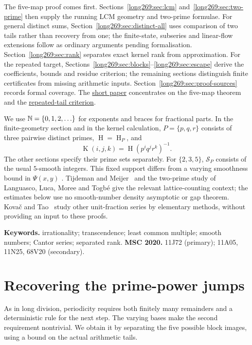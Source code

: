 \documentclass[11pt]{article}
\theoremstyle{remark}
\theoremstyle{plain}
\newcommand{\hgt}{\operatorname{H}}
\newcommand{\Kernel}{\operatorname{K}}
\begin{document}
The five-map proof comes first. Sections~\ref{long269:sec:lcm}
and~\ref{long269:sec:two-prime} then supply the running LCM geometry and
two-prime formulae. For general distinct sums,
Section~\ref{long269:sec:distinct-all} uses comparison of two tails rather
than recovery from one; the finite-state, subseries and linear-flow
extensions follow as ordinary arguments pending formalisation.
Section~\ref{long269:sec:rank} separates exact kernel rank from approximation.
For the repeated target, Sections~\ref{long269:sec:blocks}--\ref{long269:sec:escape}
derive the coefficients, bounds and residue criterion; the remaining
sections distinguish finite certificates from missing arithmetic inputs.
Section~\ref{long269:sec:proof-sources} records formal coverage. The
\href{erdos-269-three-prime-running-lcm.pdf\#r4-five-map-theorem}{short paper}
concentrates on the five-map theorem and the
\href{erdos-269-three-prime-running-lcm.pdf\#r4-repeated-criterion}{repeated-tail criterion}.

We use $\mathbb{N}=\{0,1,2,\ldots\}$ for exponents and braces for fractional parts.
In the finite-geometry section and in the kernel calculation, $P=\{p,q,r\}$ consists
of three pairwise distinct primes, $\hgt=\hgt_P$, and
\[
 \Kernel(i,j,k)=\hgt(p^iq^jr^k)^{-1}.
\]
The other sections specify their prime sets separately. For $\{2,3,5\}$,
$\mathcal S_P$ consists of the usual $5$-smooth integers. This fixed support
differs from a varying smoothness bound in $\Psi(x,y)$
\cite{hildebrand1986}. Tijdeman and Meijer~\cite[Sections~1--4]{tijdemanmeijer1974}
and the two-prime study of Languasco, Luca, Moree and Togb\'e
\cite{languasco2025} give the relevant lattice-counting context; the
estimates below use no smooth-number density asymptotic or gap theorem.
Kova\v{c} and Tao~\cite{kovactao2024} study other unit-fraction series by
elementary methods, without providing an input to these proofs.

\medskip
\noindent\textbf{Keywords.} irrationality; transcendence; least common
multiple; smooth numbers; Cantor series; separated rank.
\qquad\textbf{MSC 2020.} 11J72 (primary); 11A05, 11N25, 68V20 (secondary).

\section{Recovering the prime-power jumps}\label{long269:sec:distinct-235}
As in long division, periodicity requires both finitely many remainders
and a deterministic rule for the next step. The varying bases make the
second requirement nontrivial. We obtain it by separating the five
possible block images, using a bound on the actual arithmetic tails.
\end{document}
